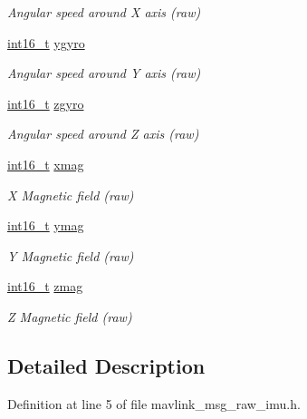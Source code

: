 \begin{DoxyCompactItemize}
\begin{DoxyCompactList}\small\item\em Angular speed around X axis (raw) \end{DoxyCompactList}\item 
\hyperlink{stdint_8h_aa343fa3b3d06292b959ffdd4c4703b06}{int16\-\_\-t} \hyperlink{struct____mavlink__raw__imu__t_aff358c8fc1fb40d5862c7367d4bf80e9}{ygyro}
\begin{DoxyCompactList}\small\item\em Angular speed around Y axis (raw) \end{DoxyCompactList}\item 
\hyperlink{stdint_8h_aa343fa3b3d06292b959ffdd4c4703b06}{int16\-\_\-t} \hyperlink{struct____mavlink__raw__imu__t_a42af4ae862faf80bb6754e09db7ca9fe}{zgyro}
\begin{DoxyCompactList}\small\item\em Angular speed around Z axis (raw) \end{DoxyCompactList}\item 
\hyperlink{stdint_8h_aa343fa3b3d06292b959ffdd4c4703b06}{int16\-\_\-t} \hyperlink{struct____mavlink__raw__imu__t_a4aa7dda8a63c114e2b60e5d9f767b9ba}{xmag}
\begin{DoxyCompactList}\small\item\em X Magnetic field (raw) \end{DoxyCompactList}\item 
\hyperlink{stdint_8h_aa343fa3b3d06292b959ffdd4c4703b06}{int16\-\_\-t} \hyperlink{struct____mavlink__raw__imu__t_a813c4472362512205eb1035d67f80ff2}{ymag}
\begin{DoxyCompactList}\small\item\em Y Magnetic field (raw) \end{DoxyCompactList}\item 
\hyperlink{stdint_8h_aa343fa3b3d06292b959ffdd4c4703b06}{int16\-\_\-t} \hyperlink{struct____mavlink__raw__imu__t_a9c91b2950a80f2598bb7c1ed484cb74a}{zmag}
\begin{DoxyCompactList}\small\item\em Z Magnetic field (raw) \end{DoxyCompactList}\end{DoxyCompactItemize}


\subsection{Detailed Description}


Definition at line 5 of file mavlink\-\_\-msg\-\_\-raw\-\_\-imu.\-h.



